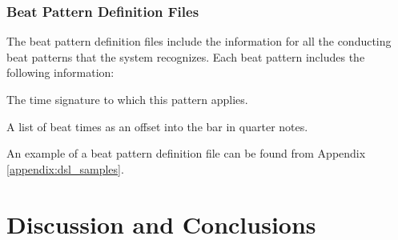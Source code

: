 \subsection{Beat Pattern Definition Files}
\label{sec:instrument_definition_format}

The beat pattern definition files include the
information for all the conducting beat patterns
that the system recognizes.
Each beat pattern includes the following information:
\begin{description}[leftmargin=24ex]
\item[Meter] The time signature to which this pattern applies.
\item[Beats] A list of beat times as an offset into the bar in quarter notes.
\end{description}
An example of a beat pattern definition file can be found from Appendix
\ref{appendix:dsl_samples}.

\chapter{Discussion and Conclusions}
\label{chapter:discussion}


